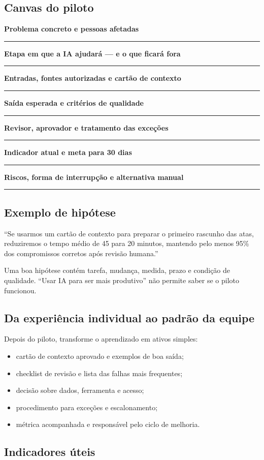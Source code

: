 \documentclass[11pt,a4paper]{article}
\newcommand{\campo}[1]{\textbf{#1}\par\vspace{1mm}\textcolor{line}{\rule{\linewidth}{0.6pt}}\par\vspace{2mm}}
\begin{document}
\newpage
\subsection{Canvas do piloto}

\begin{atividade}[title={PILOTO DE IA · UMA PÁGINA}]
\campo{Problema concreto e pessoas afetadas}
\campo{Etapa em que a IA ajudará — e o que ficará fora}
\campo{Entradas, fontes autorizadas e cartão de contexto}
\campo{Saída esperada e critérios de qualidade}
\campo{Revisor, aprovador e tratamento das exceções}
\campo{Indicador atual e meta para 30 dias}
\campo{Riscos, forma de interrupção e alternativa manual}
\end{atividade}

\subsection*{Exemplo de hipótese}

“Se usarmos um cartão de contexto para preparar o primeiro rascunho das atas, reduziremos o tempo médio de 45 para 20 minutos, mantendo pelo menos 95\% dos compromissos corretos após revisão humana.”

Uma boa hipótese contém tarefa, mudança, medida, prazo e condição de qualidade. “Usar IA para ser mais produtivo” não permite saber se o piloto funcionou.

\newpage
\subsection{Da experiência individual ao padrão da equipe}

Depois do piloto, transforme o aprendizado em ativos simples:

\begin{itemize}
  \item cartão de contexto aprovado e exemplos de boa saída;
  \item checklist de revisão e lista das falhas mais frequentes;
  \item decisão sobre dados, ferramenta e acesso;
  \item procedimento para exceções e escalonamento;
  \item métrica acompanhada e responsável pelo ciclo de melhoria.
\end{itemize}

\subsection{Indicadores úteis}
\end{document}
